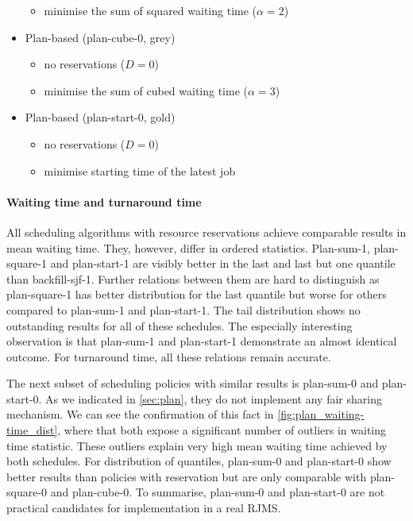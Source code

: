 \documentclass[thesis-en.tex]{subfiles}
\begin{document}
\begin{itemize}
\begin{itemize}
        \item minimise the sum of squared waiting time ($\alpha=2$)
    \end{itemize}
    \item Plan-based (plan-cube-0, grey)
    \begin{itemize}
        \item no reservations ($D=0$)
        \item minimise the sum of cubed waiting time ($\alpha=3$)
    \end{itemize}
    \item Plan-based (plan-start-0, gold)
    \begin{itemize}
        \item no reservations ($D=0$)
        \item minimise starting time of the latest job
    \end{itemize}
\end{itemize}

\paragraph{Waiting time and turnaround time}
All scheduling algorithms with resource reservations achieve comparable results in mean waiting time. They, however, differ in ordered statistics. Plan-sum-1, plan-square-1 and plan-start-1 are visibly better in the last and last but one quantile than backfill-sjf-1. Further relations between them are hard to distinguish as plan-square-1 has better distribution for the last quantile but worse for others compared to plan-sum-1 and plan-start-1. The tail distribution shows no outstanding results for all of these schedules. The especially interesting observation is that plan-sum-1 and plan-start-1 demonstrate an almost identical outcome. For turnaround time, all these relations remain accurate.

The next subset of scheduling policies with similar results is plan-sum-0 and plan-start-0. As we indicated in \autoref{sec:plan}, they do not implement any fair sharing mechanism. We can see the confirmation of this fact in \autoref{fig:plan_waiting-time_dist}, where that both expose a significant number of outliers in waiting time statistic. These outliers explain very high mean waiting time achieved by both schedules. For distribution of quantiles, plan-sum-0 and plan-start-0 show better results than policies with reservation but are only comparable with plan-square-0 and plan-cube-0. To summarise, plan-sum-0 and plan-start-0 are not practical candidates for implementation in a real RJMS.
\end{document}
